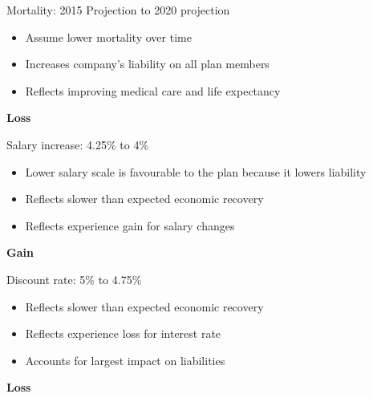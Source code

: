 \documentclass{beamer}
\begin{document}
\begin{frame}{Mortality: 2015 Projection to 2020 projection}

\begin{itemize}
\item Assume lower mortality over time
\item Increases company's liability on all plan members
\item Reflects improving medical care and life expectancy
\end{itemize}

\medskip
\qquad\textbf{Loss}

\end{frame}

\begin{frame}{Salary increase: 4.25\% to 4\%}

\begin{itemize}
\item Lower salary scale is favourable to the plan because it lowers liability
\item Reflects slower than expected economic recovery
\item Reflects experience gain for salary changes
\end{itemize}

\medskip
\qquad\textbf{Gain}

\end{frame}

\begin{frame}{Discount rate: 5\% to 4.75\%}

\begin{itemize}
\item Reflects slower than expected economic recovery
\item Reflects experience loss for interest rate
\item Accounts for largest impact on liabilities
\end{itemize}

\medskip
\qquad\textbf{Loss}

\end{frame}
\end{document}
